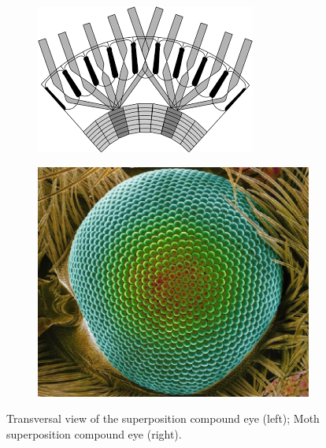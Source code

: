 \begin{figure}[H]
    \centering
    \begin{subfigure}[t]{0.48\columnwidth} %
        \centering
        \includegraphics[width=\textwidth]{Figures/refracting superposition compound eye.png}%
        \label{fig:S_Compound_eye}
    \end{subfigure}
    \hfill
    \begin{subfigure}[t]{0.48\columnwidth} %
        \centering
        \includegraphics[width=\textwidth]{Figures/Moth_Compound eye.jpg} %
        \label{fig:Moth}
    \end{subfigure}
    \caption{Transversal view of the superposition compound eye (left); Moth superposition compound eye (right).}
    \label{fig:Superposition_Compound_eye}
\end{figure}



